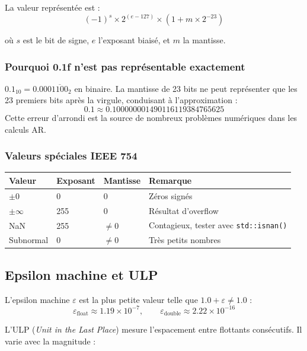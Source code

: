 \documentclass[11pt,a4paper]{article}
\begin{document}
La valeur représentée est :
\begin{equation}
(-1)^{s} \times 2^{(e-127)} \times \left(1 + m \times 2^{-23}\right)
\end{equation}

où $s$ est le bit de signe, $e$ l'exposant biaisé, et $m$ la mantisse.

\subsubsection{Pourquoi 0.1f n'est pas représentable exactement}

$0.1_{10} = 0.000\overline{1100}_2$ en binaire. La mantisse de 23 bits ne peut représenter que les 23 premiers bits après la virgule, conduisant à l'approximation :
\[
0.1 \approx 0.100000001490116119384765625
\]
Cette erreur d'arrondi est la source de nombreux problèmes numériques dans les calculs AR.

\subsubsection{Valeurs spéciales IEEE 754}

\begin{center}
\renewcommand{\arraystretch}{1.4}
\begin{tabular}{llll}
\toprule
\textbf{Valeur} & \textbf{Exposant} & \textbf{Mantisse} & \textbf{Remarque} \\
\midrule
$\pm 0$      & 0   & 0        & Zéros signés \\
$\pm \infty$ & 255 & 0        & Résultat d'overflow \\
NaN          & 255 & $\neq 0$ & Contagieux, tester avec \texttt{std::isnan()} \\
Subnormal    & 0   & $\neq 0$ & Très petits nombres \\
\bottomrule
\end{tabular}
\end{center}

\subsection{Epsilon machine et ULP}

L'epsilon machine $\varepsilon$ est la plus petite valeur telle que $1.0 + \varepsilon \neq 1.0$ :
\[
\varepsilon_{\text{float}} \approx 1.19 \times 10^{-7}, \qquad \varepsilon_{\text{double}} \approx 2.22 \times 10^{-16}
\]

L'ULP (\textit{Unit in the Last Place}) mesure l'espacement entre flottants consécutifs. Il varie avec la magnitude :
\end{document}
